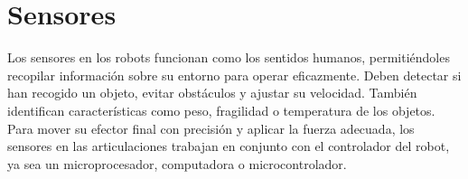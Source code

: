\section{Sensores}
Los sensores en los robots funcionan como los sentidos humanos, permitiéndoles recopilar información sobre su entorno para operar eficazmente. Deben detectar si han recogido un objeto, evitar obstáculos y ajustar su velocidad. También identifican características como peso, fragilidad o temperatura de los objetos. Para mover su efector final con precisión y aplicar la fuerza adecuada, los sensores en las articulaciones trabajan en conjunto con el controlador del robot, ya sea un microprocesador, computadora o microcontrolador.